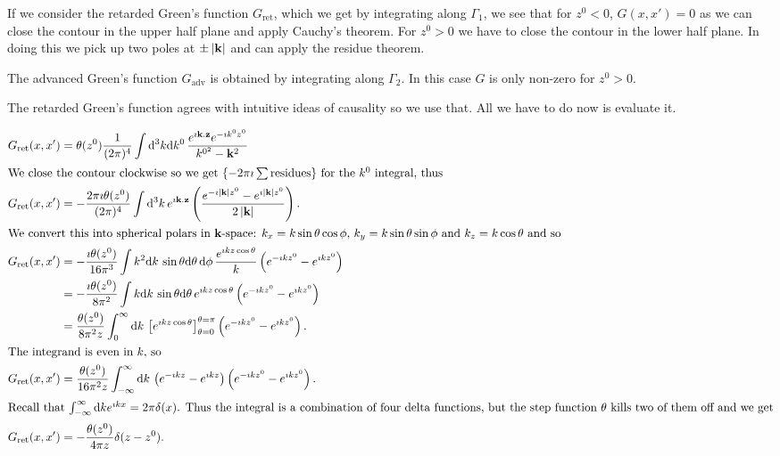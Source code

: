 \documentclass{notes}
\begin{document}
\vspace{1in}

If we consider the retarded Green's function $G_{\text{ret}}$,
which we get by integrating along $\Gamma_1$, we see that
for $z^0 < 0$, $G(x,x') = 0$ as we can close the contour
in the upper half plane and apply Cauchy's theorem.  For
$z^0 > 0$ we have to close the contour in the lower half plane.  In doing
this we pick up two poles at $\pm \left|\mathbf{k}\right|$ and can apply the residue
theorem.

The advanced Green's function $G_{\text{adv}}$ is obtained by
integrating along $\Gamma_2$.  In this case $G$ is only non-zero
for $z^0 > 0$.

The retarded Green's function agrees with intuitive
ideas of causality so we use that.  All we have to do now is
evaluate it.

\begin{align*}
G_{\text{ret}}(x,x') &= \theta(z^0) \frac{1}{(2 \pi)^4}
\int \mathrm{d}^3 k \mathrm{d} k^0\, \frac{e^{\imath \mathbf{k}.\mathbf{z}}
e^{- \imath k^0 z^0}}{k^{0^2} -\mathbf{k}^2 } \\
\intertext{We close the contour clockwise so we get
$\left\{- 2 \pi \imath \sum \text{residues}\right\}$ for the
$k^0$ integral, thus}
G_{\text{ret}}(x,x') &= - \frac{2 \pi \imath \theta(z^0)}{(2 \pi)^4}
\int \mathrm{d}^3 k\, e^{\imath \mathbf{k}.\mathbf{z}}
\left( \frac{e^{- \imath \left|\mathbf{k}\right| z^0}
- e^{\imath \left|\mathbf{k}\right| z^0}}{2 \left|\mathbf{k}\right|} \right). \\
\intertext{We convert this into spherical polars in $\mathbf{k}$-space:
$k_x = k \sin \theta \cos \phi$, $k_y = k \sin \theta \sin \phi$
and $k_z = k \cos \theta$ and so}
G_{\text{ret}}(x,x') &= - \frac{ \imath \theta(z^0)}{16 \pi^3}
\int k^2 \mathrm{d} k\, \sin \theta \mathrm{d} \theta\, \mathrm{d} \phi\,
\frac{e^{\imath k z \cos \theta}}{k} \left(
e^{-\imath k z^0} - e^{\imath k z^0}
\right) \\
&= - \frac{\imath \theta(z^0)}{8 \pi^2}
\int k \mathrm{d} k\, \sin \theta \mathrm{d} \theta\,
e^{\imath k z \cos \theta} \left(e^{-\imath k z^0} - e^{\imath k z^0}
\right) \\
&= \frac{\theta(z^0)}{8 \pi^2 z}
\int_0^\infty \mathrm{d} k\, \left[e^{\imath k z \cos \theta}
\right]_{\theta=0}^{\theta=\pi} \left(e^{-\imath k z^0} -
e^{\imath k z^0}\right). \\
\intertext{The integrand is even in $k$, so}
G_{\text{ret}}(x,x') &=
\frac{\theta(z^0)}{16 \pi^2 z}
\int_{-\infty}^\infty \mathrm{d} k\, \left(
e^{-\imath k z} - e^{\imath k z}
\right) \left( e^{-\imath k z^0} - e^{\imath k z^0}\right).\\
\intertext{Recall that $\int_{-\infty}^\infty \mathrm{d} k e^{\imath k x}
= 2 \pi \delta(x)$.  Thus the integral is a combination of four
delta functions, but the step function $\theta$ kills two of them off
and we get}
G_{\text{ret}}(x,x') &= - \frac{\theta(z^0)}{4 \pi z}
\delta(z - z^0).
\end{align*}
\end{document}

